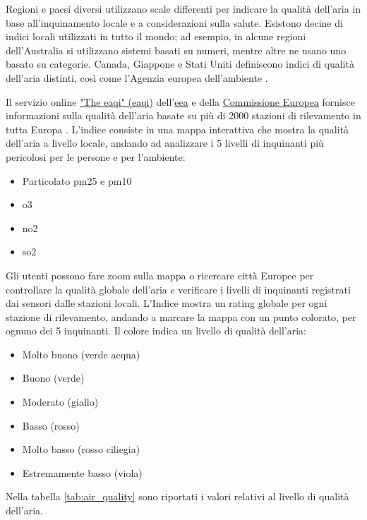Regioni e paesi diversi utilizzano scale differenti per indicare la qualità dell'aria in base all'inquinamento locale e
a considerazioni sulla salute. Esistono decine di indici locali utilizzati in tutto il mondo;
ad esempio, in alcune regioni dell'Australia si utilizzano sistemi basati su numeri, mentre altre ne usano uno basato
su categorie. Canada, Giappone e Stati Uniti definiscono indici di qualità dell'aria distinti, così come
l'Agenzia europea dell'ambiente \cite{EuropeanEnvironmentAgency}.

Il servizio online \href{https://airindex.eea.europa.eu/AQI/index.html}{"The \acrlong{eaqi}" (\acrshort{eaqi})}
dell'\href{https://www.eea.europa.eu/it}{\acrfull{eea}} e
della \href{https://commission.europa.eu/index_it}{Commissione Europea} fornisce informazioni sulla qualità
dell'aria basate su più di 2000 stazioni di rilevamento in tutta Europa \cite{EEA2017IndiceEuropeo}.
L'indice consiste in una mappa interattiva che mostra la qualità dell'aria a livello locale,
andando ad analizzare i 5 livelli di inquinanti più pericolosi per le persone e per l'ambiente:

\begin{itemize}
  \item Particolato \acrshort{pm25} e \acrshort{pm10}
  \item \acrfull{o3}
  \item \acrfull{no2}
  \item \acrfull{so2}
\end{itemize}

Gli utenti possono fare zoom sulla mappa o ricercare città Europee per controllare la qualità globale dell'aria e
verificare i livelli di inquinanti registrati dai sensori dalle stazioni locali. L'Indice mostra un rating globale
per ogni stazione di rilevamento, andando a marcare la mappa con un punto colorato, per ognuno dei 5 inquinanti.
Il colore indica un livello di qualità dell'aria:
\begin{itemize}
  \item Molto buono (verde acqua)
  \item Buono (verde)
  \item Moderato (giallo)
  \item Basso (rosso)
  \item Molto basso (rosso ciliegia)
  \item Estremamente basso (viola)
\end{itemize}

Nella tabella \ref{tab:air_quality} sono riportati i valori relativi al livello di qualità dell'aria.

